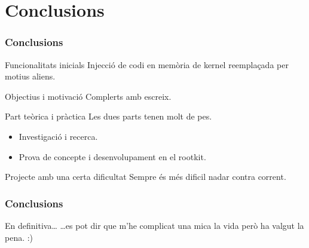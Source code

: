 \documentclass{beamer}
\begin{document}
\section{Conclusions}
\begin{frame}
	\frametitle{Conclusions}

	\begin{block}{Funcionalitats inicials}
	Injecció de codi en memòria de kernel reemplaçada per motius aliens.
	\end{block}

	\begin{block}{Objectius i motivació}
	Complerts amb escreix.
	\end{block}

	\begin{block}{Part teòrica i pràctica}
		Les dues parts tenen molt de pes.
		\begin{itemize}
			\item Investigació i recerca.
			\item Prova de concepte i desenvolupament en el rootkit.
		\end{itemize}
	\end{block}

	\begin{block}{Projecte amb una certa dificultat}
	Sempre és més dificil nadar contra corrent.
	\end{block}

\end{frame}

\begin{frame}
    \frametitle{Conclusions}
	\begin{block}{En definitiva\ldots}
	 \ldots es pot dir que m'he complicat una mica la vida però ha valgut la pena. :)
	\end{block}
\end{frame}
\end{document}
